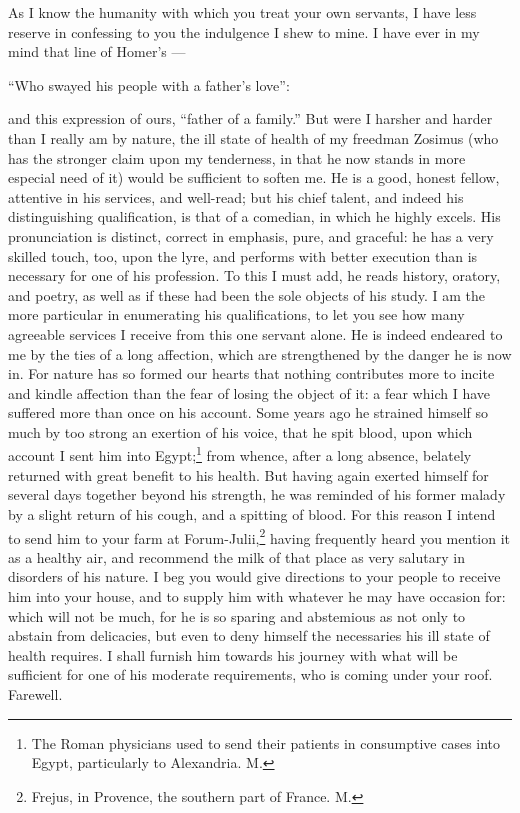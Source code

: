 
As I know the humanity with which you treat your own servants, I have less
reserve in confessing to you the indulgence I shew to mine. I have ever in
my mind that line of Homer's —

``Who swayed his people with a father's love'':

and this expression of ours, ``father of a family.'' But were I harsher and
harder than I really am by nature, the ill state of health of my freedman
Zosimus (who has the stronger claim upon my tenderness, in that he now
stands in more especial need of it) would be sufficient to soften me. He
is a good, honest fellow, attentive in his services, and well-read; but
his chief talent, and indeed his distinguishing qualification, is that of
a comedian, in which he highly excels. His pronunciation is distinct,
correct in emphasis, pure, and graceful: he has a very skilled touch, too,
upon the lyre, and performs with better execution than is necessary for
one of his profession. To this I must add, he reads history, oratory, and
poetry, as well as if these had been the sole objects of his study. I am
the more particular in enumerating his qualifications, to let you see how
many agreeable services I receive from this one servant alone. He is
indeed endeared to me by the ties of a long affection, which are
strengthened by the danger he is now in. For nature has so formed our
hearts that nothing contributes more to incite and kindle affection than
the fear of losing the object of it: a fear which I have suffered more
than once on his account. Some years ago he strained himself so much by
too strong an exertion of his voice, that he spit blood, upon which
account I sent him into Egypt;\footnote{The Roman physicians used
to send their patients in consumptive cases into Egypt, particularly to
Alexandria. M.} from whence, after a long absence, belately
returned with great benefit to his health. But having again exerted
himself for several days together beyond his strength, he was reminded of
his former malady by a slight return of his cough, and a spitting of
blood. For this reason I intend to send him to your farm at Forum-Julii,\footnote{Frejus, in Provence, the
southern part of France. M.}
having frequently heard you mention it as a healthy air, and recommend the
milk of that place as very salutary in disorders of his nature. I beg you
would give directions to your people to receive him into your house, and
to supply him with whatever he may have occasion for: which will not be
much, for he is so sparing and abstemious as not only to abstain from
delicacies, but even to deny himself the necessaries his ill state of
health requires. I shall furnish him towards his journey with what will be
sufficient for one of his moderate requirements, who is coming under your
roof. Farewell.


